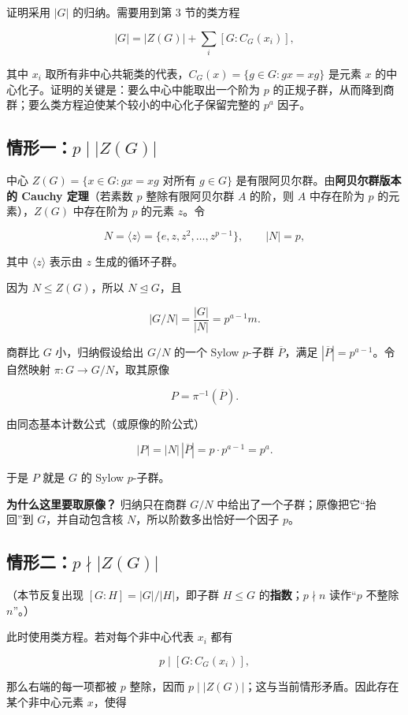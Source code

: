 证明采用 $|G|$ 的归纳。需要用到第 3 节的类方程

\[
|G|=|Z(G)|+\sum_i [G:C_G(x_i)],
\]

其中 $x_i$ 取所有非中心共轭类的代表，$C_G(x)=\{g\in G:gx=xg\}$ 是元素 $x$ 的中心化子。证明的关键是：要么中心中能取出一个阶为 $p$ 的正规子群，从而降到商群；要么类方程迫使某个较小的中心化子保留完整的 $p^a$ 因子。

\subsection{情形一：$p\mid |Z(G)|$}


中心 $Z(G)=\{x\in G:gx=xg\text{ 对所有 }g\in G\}$ 是有限阿贝尔群。由\textbf{阿贝尔群版本的 Cauchy 定理}（若素数 $p$ 整除有限阿贝尔群 $A$ 的阶，则 $A$ 中存在阶为 $p$ 的元素），$Z(G)$ 中存在阶为 $p$ 的元素 $z$。令

\[
N=\langle z\rangle=\{e,z,z^2,\dots,z^{p-1}\},\qquad |N|=p,
\]

其中 $\langle z\rangle$ 表示由 $z$ 生成的循环子群。

因为 $N\le Z(G)$，所以 $N\trianglelefteq G$，且

\[
|G/N|=\frac{|G|}{|N|}=p^{a-1}m.
\]

商群比 $G$ 小，归纳假设给出 $G/N$ 的一个 Sylow $p$-子群 $\overline P$，满足 $|\overline P|=p^{a-1}$。令自然映射 $\pi:G\to G/N$，取其原像

\[
P=\pi^{-1}(\overline P).
\]

由同态基本计数公式（或原像的阶公式）

\[
|P|=|N|\,|\overline P|=p\cdot p^{a-1}=p^a.
\]

于是 $P$ 就是 $G$ 的 Sylow $p$-子群。

\textbf{为什么这里要取原像？} 归纳只在商群 $G/N$ 中给出了一个子群；原像把它“抬回”到 $G$，并自动包含核 $N$，所以阶数多出恰好一个因子 $p$。

\subsection{情形二：$p\nmid |Z(G)|$}


（本节反复出现 $[G:H]=|G|/|H|$，即子群 $H\le G$ 的\textbf{指数}；$p\nmid n$ 读作“$p$ 不整除 $n$”。）

此时使用类方程。若对每个非中心代表 $x_i$ 都有

\[
p\mid [G:C_G(x_i)],
\]

那么右端的每一项都被 $p$ 整除，因而 $p\mid |Z(G)|$；这与当前情形矛盾。因此存在某个非中心元素 $x$，使得

